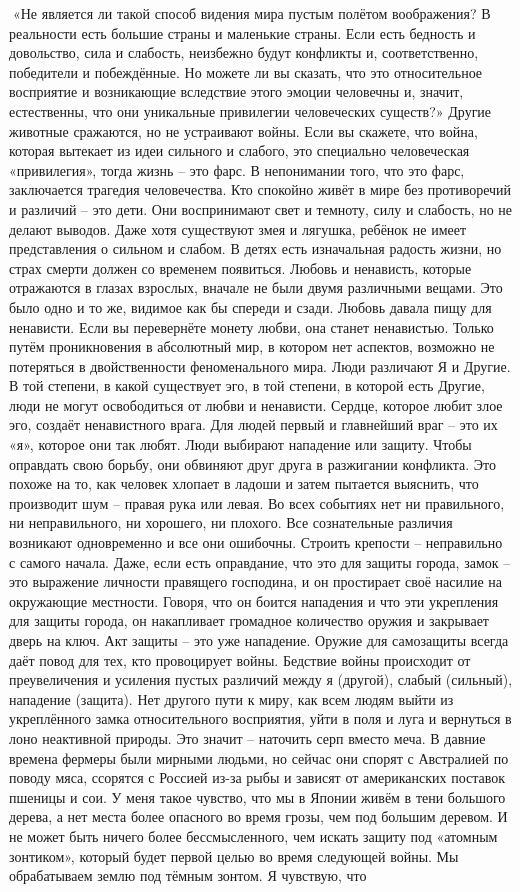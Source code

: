 \documentclass[a4paper]{book}
\begin{document}
«Не является ли такой способ видения мира пустым полётом воображения? В
реальности есть большие страны и маленькие страны. Если есть бедность и довольство,
сила и слабость, неизбежно будут конфликты и, соответственно, победители и побеждённые.
Но можете ли вы сказать, что это относительное восприятие и возникающие вследствие
этого эмоции человечны и, значит, естественны, что они уникальные привилегии
человеческих существ?»
Другие животные сражаются, но не устраивают войны. Если вы скажете, что война,
которая вытекает из идеи сильного и слабого, это специально человеческая «привилегия»,
тогда жизнь – это фарс. В непонимании того, что это фарс, заключается трагедия
человечества.
Кто спокойно живёт в мире без противоречий и различий – это дети. Они
воспринимают свет и темноту, силу и слабость, но не делают выводов. Даже хотя
существуют змея и лягушка, ребёнок не имеет представления о сильном и слабом. В детях
есть изначальная радость жизни, но страх смерти должен со временем появиться.
Любовь и ненависть, которые отражаются в глазах взрослых, вначале не были двумя
различными вещами. Это было одно и то же, видимое как бы спереди и сзади. Любовь
давала пищу для ненависти. Если вы перевернёте монету любви, она станет ненавистью.
Только путём проникновения в абсолютный мир, в котором нет аспектов, возможно не
потеряться в двойственности феноменального мира.
Люди различают Я и Другие. В той степени, в какой существует эго, в той степени, в
которой есть Другие, люди не могут освободиться от любви и ненависти. Сердце, которое
любит злое эго, создаёт ненавистного врага. Для людей первый и главнейший враг – это их
«я», которое они так любят.
Люди выбирают нападение или защиту. Чтобы оправдать свою борьбу, они обвиняют
друг друга в разжигании конфликта. Это похоже на то, как человек хлопает в ладоши и затем
пытается выяснить, что производит шум – правая рука или левая. Во всех событиях нет ни
правильного, ни неправильного, ни хорошего, ни плохого. Все сознательные различия
возникают одновременно и все они ошибочны.
Строить крепости – неправильно с самого начала. Даже, если есть оправдание, что это
для защиты города, замок – это выражение личности правящего господина, и он простирает
своё насилие на окружающие местности. Говоря, что он боится нападения и что эти
укрепления для защиты города, он накапливает громадное количество оружия и закрывает
дверь на ключ.
Акт защиты – это уже нападение. Оружие для самозащиты всегда даёт повод для тех, кто
провоцирует войны. Бедствие войны происходит от преувеличения и усиления пустых
различий между я (другой), слабый (сильный), нападение (защита). Нет другого пути к миру,
как всем людям выйти из укреплённого замка относительного восприятия, уйти в поля и
луга и вернуться в лоно неактивной природы. Это значит – наточить серп вместо меча.
В давние времена фермеры были мирными людьми, но сейчас они спорят с Австралией
по поводу мяса, ссорятся с Россией из-за рыбы и зависят от американских поставок
пшеницы и сои.
У меня такое чувство, что мы в Японии живём в тени большого дерева, а нет места
более опасного во время грозы, чем под большим деревом. И не может быть ничего более
бессмысленного, чем искать защиту под «атомным зонтиком», который будет первой целью
во время следующей войны. Мы обрабатываем землю под тёмным зонтом. Я чувствую, что
\end{document}
